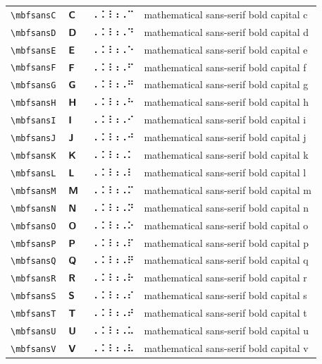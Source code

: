 \documentclass[oneside]{article}
\begin{document}
\begin{longtable}{llll}
\verb|\mbfsansC| & $\mbfsansC$ &  ⠠⠨⠸⠰⠠⠉  & {mathematical sans-serif bold capital c} \\[2ex]
\verb|\mbfsansD| & $\mbfsansD$ &  ⠠⠨⠸⠰⠠⠙  & {mathematical sans-serif bold capital d} \\[2ex]
\verb|\mbfsansE| & $\mbfsansE$ &  ⠠⠨⠸⠰⠠⠑  & {mathematical sans-serif bold capital e} \\[2ex]
\verb|\mbfsansF| & $\mbfsansF$ &  ⠠⠨⠸⠰⠠⠋  & {mathematical sans-serif bold capital f} \\[2ex]
\verb|\mbfsansG| & $\mbfsansG$ &  ⠠⠨⠸⠰⠠⠛  & {mathematical sans-serif bold capital g} \\[2ex]
\verb|\mbfsansH| & $\mbfsansH$ &  ⠠⠨⠸⠰⠠⠓  & {mathematical sans-serif bold capital h} \\[2ex]
\verb|\mbfsansI| & $\mbfsansI$ &  ⠠⠨⠸⠰⠠⠊  & {mathematical sans-serif bold capital i} \\[2ex]
\verb|\mbfsansJ| & $\mbfsansJ$ &  ⠠⠨⠸⠰⠠⠚  & {mathematical sans-serif bold capital j} \\[2ex]
\verb|\mbfsansK| & $\mbfsansK$ &  ⠠⠨⠸⠰⠠⠅  & {mathematical sans-serif bold capital k} \\[2ex]
\verb|\mbfsansL| & $\mbfsansL$ &  ⠠⠨⠸⠰⠠⠇  & {mathematical sans-serif bold capital l} \\[2ex]
\verb|\mbfsansM| & $\mbfsansM$ &  ⠠⠨⠸⠰⠠⠍  & {mathematical sans-serif bold capital m} \\[2ex]
\verb|\mbfsansN| & $\mbfsansN$ &  ⠠⠨⠸⠰⠠⠝  & {mathematical sans-serif bold capital n} \\[2ex]
\verb|\mbfsansO| & $\mbfsansO$ &  ⠠⠨⠸⠰⠠⠕  & {mathematical sans-serif bold capital o} \\[2ex]
\verb|\mbfsansP| & $\mbfsansP$ &  ⠠⠨⠸⠰⠠⠏  & {mathematical sans-serif bold capital p} \\[2ex]
\verb|\mbfsansQ| & $\mbfsansQ$ &  ⠠⠨⠸⠰⠠⠟  & {mathematical sans-serif bold capital q} \\[2ex]
\verb|\mbfsansR| & $\mbfsansR$ &  ⠠⠨⠸⠰⠠⠗  & {mathematical sans-serif bold capital r} \\[2ex]
\verb|\mbfsansS| & $\mbfsansS$ &  ⠠⠨⠸⠰⠠⠎  & {mathematical sans-serif bold capital s} \\[2ex]
\verb|\mbfsansT| & $\mbfsansT$ &  ⠠⠨⠸⠰⠠⠞  & {mathematical sans-serif bold capital t} \\[2ex]
\verb|\mbfsansU| & $\mbfsansU$ &  ⠠⠨⠸⠰⠠⠥  & {mathematical sans-serif bold capital u} \\[2ex]
\verb|\mbfsansV| & $\mbfsansV$ &  ⠠⠨⠸⠰⠠⠧  & {mathematical sans-serif bold capital v} \\[2ex]

\end{longtable}
\end{document}
